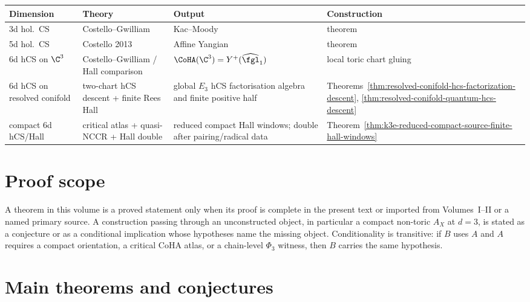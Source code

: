 \begin{center}
\begin{tabular}{@{}llll@{}}
\toprule
\textbf{Dimension} & \textbf{Theory} & \textbf{Output} & \textbf{Construction} \\
\midrule
3d hol.\ CS & Costello--Gwilliam & Kac--Moody & theorem \\
5d hol.\ CS & Costello 2013 & Affine Yangian & theorem \\
6d hCS on $\C^3$ & Costello--Gwilliam / Hall comparison &
 $\CoHA(\C^3)=Y^+(\widehat{\fgl}_1)$ & local toric chart gluing \\
6d hCS on resolved conifold & two-chart hCS descent + finite Rees Hall &
 global $E_3$ hCS factorisation algebra and finite positive half &
 Theorems~\ref{thm:resolved-conifold-hcs-factorization-descent},
 \ref{thm:resolved-conifold-quantum-hcs-descent} \\
compact 6d hCS/Hall & critical atlas + quasi-NCCR + Hall double &
 reduced compact Hall windows; double after pairing/radical data &
 Theorem~\ref{thm:k3e-reduced-compact-source-finite-hall-windows} \\
\bottomrule
\end{tabular}
\end{center}

\section{Proof scope}
\label{sec:nc-proof-regimes}

A theorem in this volume is a proved statement only when its proof is
complete in the present text or imported from Volumes~I--II or a named
primary source. A construction passing through an unconstructed object,
in particular a compact non-toric \(A_X\) at \(d=3\), is stated as a
conjecture or as a conditional implication whose hypotheses name the
missing object. Conditionality is transitive: if \(B\) uses \(A\) and
\(A\) requires a compact orientation, a critical CoHA atlas, or a
chain-level \(\Phi_3\) witness, then \(B\) carries the same hypothesis.

\section{Main theorems and conjectures}
\label{sec:nc-theorems}

